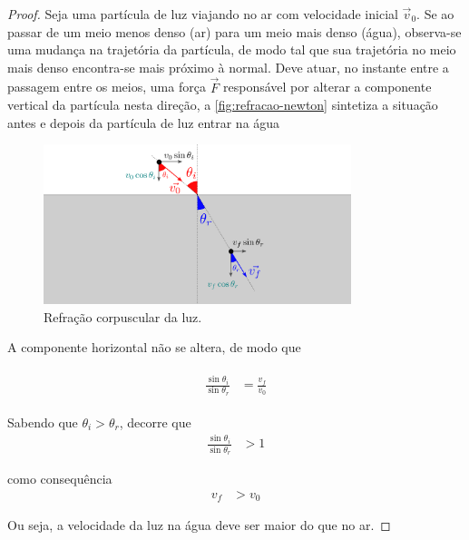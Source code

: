     \begin{proof}
        Seja uma partícula de luz viajando no ar com velocidade inicial $\vec{v}_0$. Se ao passar de um meio menos denso (ar) para um meio mais denso (água), observa-se uma mudança na trajetória da partícula, de modo tal que sua trajetória no meio mais denso encontra-se mais próximo à normal. Deve atuar, no instante entre a passagem entre os meios, uma força $\vec{F}$ responsável por alterar a componente vertical da partícula nesta direção, a \autoref{fig:refracao-newton} sintetiza a situação antes e depois da partícula de luz entrar na água
        
    \vspace*{20pt}
    \begin{figure}[!ht]
        \centering
        \includegraphics[width=0.8\textwidth]{img/refracao-newton.png}
        \caption{Refração corpuscular da luz.}
        \label{fig:refracao-newton}
    \end{figure}
    \vspace*{20pt}

    A componente horizontal não se altera, de modo que

    \begin{align}
        \begin{split}
            \frac{\sin\theta_i}{\sin\theta_r}&=\frac{v_f}{v_0}
        \end{split}
    \end{align}

    Sabendo que $\theta_i>\theta_r$, decorre que
    \begin{align}
        \frac{\sin\theta_i}{\sin\theta_r}&>1
    \end{align}

    como consequência
    \begin{align}
        v_f&>v_0
    \end{align}

    Ou seja, a velocidade da luz na água deve ser maior do que no ar.
    \end{proof}

    